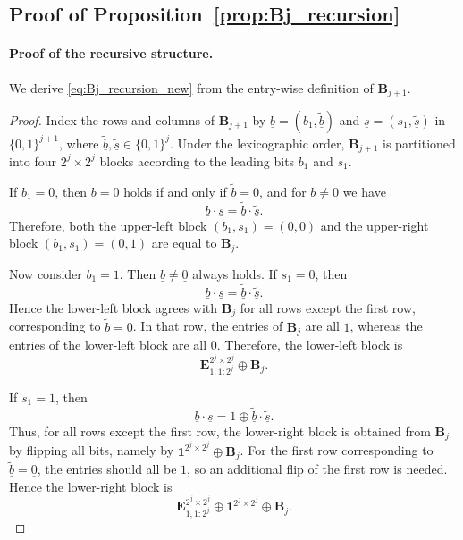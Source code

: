 \documentclass[letterpaper,draftclsnofoot,onecolumn]{IEEEtran}
\begin{document}
{\appendix

\subsection{Proof of Proposition~\ref{prop:Bj_recursion}}
\label{app:Bj_recursion}

\paragraph{Proof of the recursive structure.}

We derive \eqref{eq:Bj_recursion_new} from the entry-wise definition of $\mathbf{B}_{j+1}$.

\begin{proof}
    
Index the rows and columns of $\mathbf{B}_{j+1}$ by $\underline{b}=(b_1,\tilde{\underline{b}})$ and $\underline{s}=(s_1,\tilde{\underline{s}})$ in $\{0,1\}^{j+1}$, where $\tilde{\underline{b}},\tilde{\underline{s}}\in\{0,1\}^j$. Under the lexicographic order, $\mathbf{B}_{j+1}$ is partitioned into four $2^j\times 2^j$ blocks according to the leading bits $b_1$ and $s_1$.

If $b_1=0$, then $\underline{b}=\underline{0}$ holds if and only if $\tilde{\underline{b}}=\underline{0}$, and for $\underline{b}\neq \underline{0}$ we have
\begin{equation}
\underline{b}\cdot\underline{s}
=
\tilde{\underline{b}}\cdot\tilde{\underline{s}}.
\end{equation}
Therefore, both the upper-left block $(b_1,s_1)=(0,0)$ and the upper-right block $(b_1,s_1)=(0,1)$ are equal to $\mathbf{B}_j$.

Now consider $b_1=1$. Then $\underline{b}\neq \underline{0}$ always holds. If $s_1=0$, then
\begin{equation}
\underline{b}\cdot\underline{s}
=
\tilde{\underline{b}}\cdot\tilde{\underline{s}}.
\end{equation}
Hence the lower-left block agrees with $\mathbf{B}_j$ for all rows except the first row, corresponding to $\tilde{\underline{b}}=\underline{0}$. In that row, the entries of $\mathbf{B}_j$ are all $1$, whereas the entries of the lower-left block are all $0$. Therefore, the lower-left block is
\begin{equation}
\mathbf{E}^{2^j\times 2^j}_{1,1:2^j}\oplus \mathbf{B}_j.
\end{equation}

If $s_1=1$, then
\begin{equation}
\underline{b}\cdot\underline{s}
=
1\oplus \tilde{\underline{b}}\cdot\tilde{\underline{s}}.
\end{equation}
Thus, for all rows except the first row, the lower-right block is obtained from $\mathbf{B}_j$ by flipping all bits, namely by $\mathbf{1}^{2^j\times 2^j}\oplus \mathbf{B}_j$. For the first row corresponding to $\tilde{\underline{b}}=\underline{0}$, the entries should all be $1$, so an additional flip of the first row is needed. Hence the lower-right block is
\begin{equation}
\mathbf{E}^{2^j\times 2^j}_{1,1:2^j}\oplus \mathbf{1}^{2^j\times 2^j}\oplus \mathbf{B}_j.
\end{equation}


\end{proof}}
\end{document}
